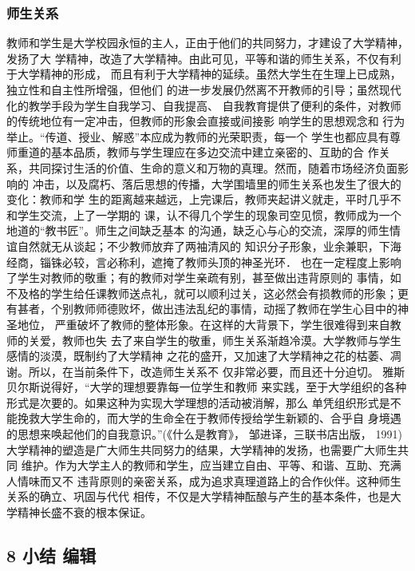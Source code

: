 \documentclass[11pt]{ctexart}
\begin{document}
{{{{\subsubsection{师生关系}
\label{sec:org2bf69d1}

教师和学生是大学校园永恒的主人，正由于他们的共同努力，才建设了大学精神，发扬了大
学精神，改造了大学精神。由此可见，平等和谐的师生关系，不仅有利于大学精神的形成，
而且有利于大学精神的延续。虽然大学生在生理上已成熟，独立性和自主性所增强，但他们
的进一步发展仍然离不开教师的引导；虽然现代化的教学手段为学生自我学习、自我提高、
自我教育提供了便利的条件，对教师的传统地位有一定冲击，但教师的形象会直接或间接影
响学生的思想观念和 行为举止。“传道、授业、解惑”本应成为教师的光荣职责，每一个
学生也都应具有尊师重道的基本品质，教师与学生理应在多边交流中建立亲密的、互助的合
作关系，共同探讨生活的价值、生命的意义和万物的真理。然而，随着市场经济负面影响的
冲击，以及腐朽、落后思想的传播，大学围墙里的师生关系也发生了很大的变化：教师和学
生的距离越来越远，上完课后，教师夹起讲义就走，平时几乎不和学生交流，上了一学期的
课，认不得几个学生的现象司空见惯，教师成为一个地道的“教书匠”。师生之间缺乏基本
的沟通，缺乏心与心的交流，深厚的师生情谊自然就无从谈起；不少教师放弃了两袖清风的
知识分子形象，业余兼职，下海经商，锱铢必较，言必称利，遮掩了教师头顶的神圣光环．
也在一定程度上影响了学生对教师的敬重；有的教师对学生亲疏有别，甚至做出违背原则的
事情，如不及格的学生给任课教师送点礼，就可以顺利过关，这必然会有损教师的形象；更
有甚者，个别教师师德败坏，做出违法乱纪的事情，动摇了教师在学生心目中的神圣地位，
严重破坏了教师的整体形象。在这样的大背景下，学生很难得到来自教师的关爱，教师也失
去了来自学生的敬重，师生关系渐趋冷漠。大学教师与学生感情的淡漠，既制约了大学精神
之花的盛开，又加速了大学精神之花的枯萎、凋谢。所以，在当前条件下，改造师生关系不
仅非常必要，而且还十分迫切。 雅斯贝尔斯说得好，“大学的理想要靠每一位学生和教师
来实践，至于大学组织的各种形式是次要的。如果这种为实现大学理想的活动被消解，那么
单凭组织形式是不能挽救大学生命的，而大学的生命全在于教师传授给学生新颖的、合乎自
身境遇的思想来唤起他们的自我意识。”(《什么是教育》， 邹进译，三联书店出版，
1991)大学精神的塑造是广大师生共同努力的结果，大学精神的发扬，也需要广大师生共同
维护。作为大学主人的教师和学生，应当建立自由、平等、和谐、互助、充满人情味而又不
违背原则的亲密关系，成为追求真理道路上的合作伙伴。这种师生关系的确立、巩固与代代
相传，不仅是大学精神酝酿与产生的基本条件，也是大学精神长盛不衰的根本保证。


\subsection{8 小结 编辑}
\label{sec:org6339d96}

}}}}
\end{document}
